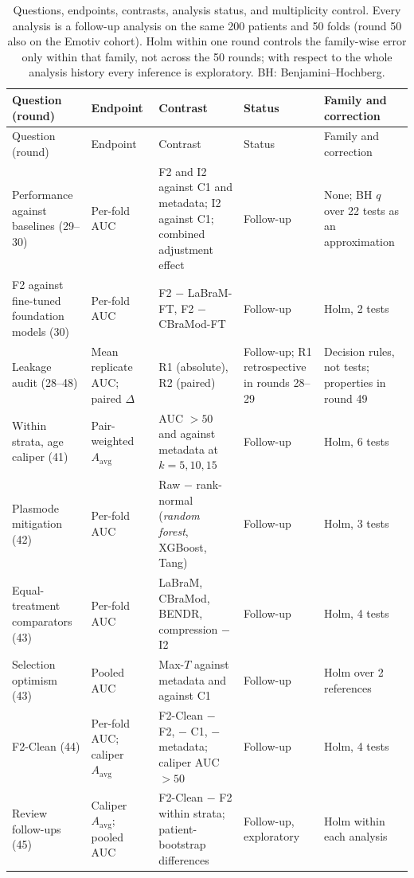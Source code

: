 {\scriptsize
\setlength{\tabcolsep}{2.5pt}
\begin{longtable}{p{}p{}p{}p{}p{}}
\caption{Questions, endpoints, contrasts, analysis status, and multiplicity control. Every analysis is a follow-up analysis on the same 200 patients and 50 folds (round 50 also on the Emotiv cohort). Holm within one round controls the family-wise error only within that family, not across the 50 rounds; with respect to the whole analysis history every inference is exploratory. BH: Benjamini--Hochberg.}\label{tab:peta_hipotesis}\\
\toprule
Question (round) & Endpoint & Contrast & Status & Family and correction \\
\midrule
\endfirsthead
\toprule
Question (round) & Endpoint & Contrast & Status & Family and correction \\
\midrule
\endhead
\bottomrule
\endfoot
Performance against baselines (29--30) & Per-fold AUC & F2 and I2 against C1 and metadata; I2 against C1; combined adjustment effect & Follow-up & None; BH $q$ over 22 tests as an approximation \\
F2 against fine-tuned foundation models (30) & Per-fold AUC & F2 $-$ LaBraM-FT, F2 $-$ CBraMod-FT & Follow-up & Holm, 2 tests \\
Leakage audit (28--48) & Mean replicate AUC; paired $\Delta$ & R1 (absolute), R2 (paired) & Follow-up; R1 retrospective in rounds 28--29 & Decision rules, not tests; properties in round 49 \\
Within strata, age caliper (41) & Pair-weighted $A_{\mathrm{avg}}$ & AUC $>50$ and against metadata at $k=5,10,15$ & Follow-up & Holm, 6 tests \\
Plasmode mitigation (42) & Per-fold AUC & Raw $-$ rank-normal (\textit{random forest}, XGBoost, Tang) & Follow-up & Holm, 3 tests \\
Equal-treatment comparators (43) & Per-fold AUC & LaBraM, CBraMod, BENDR, compression $-$ I2 & Follow-up & Holm, 4 tests \\
Selection optimism (43) & Pooled AUC & Max-$T$ against metadata and against C1 & Follow-up & Holm over 2 references \\
F2-Clean (44) & Per-fold AUC; caliper $A_{\mathrm{avg}}$ & F2-Clean $-$ F2, $-$ C1, $-$ metadata; caliper AUC $>50$ & Follow-up & Holm, 4 tests \\
Review follow-ups (45) & Caliper $A_{\mathrm{avg}}$; pooled AUC & F2-Clean $-$ F2 within strata; patient-bootstrap differences & Follow-up, exploratory & Holm within each analysis \\

\end{longtable}}
